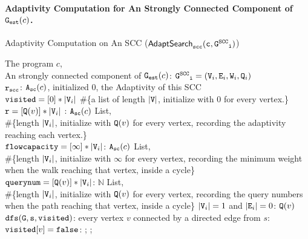\paragraph*{Adaptivity Computation for An Strongly Connected Component of $\mathtt{{G_{est}}}(c)$.}
\begin{algorithm}
 \caption{
 {Adaptivity Computation on An SCC ({$\mathtt{\mathsf{AdaptSearch}_{scc}(c, \mathtt{G^{SCC}}_i)}$})}
 \label{alg:adaptscc}
 }
 \begin{algorithmic}[1]
 \REQUIRE 
 The program $c$, 
 \\ \qquad
 An strongly connected component of $\mathtt{{G_{est}}}(c)$: 
 $ \mathtt{\mathtt{G^{SCC}}_i} = (\mathtt{V}_i, \mathtt{E}_i, \mathtt{W}_i, \mathtt{Q}_i)$
 \\
 $\mathtt{r_{scc}}$: ${\mathtt{A_{sc}}}(c)$, initialized $0$, the Adaptivity of this SCC
 \STATE {} 
 \\ \qquad $\mathtt{visited} = [0]*|\mathtt{V}_i|$ \#\{a list of length $|\mathtt{V}|$, initialize with $0$ for every vertex.\}
 \\ \qquad $\mathtt{r} = [\mathtt{Q}(v)]* |\mathtt{V}_i|$ : ${\mathtt{A_{sc}}}(c)$ List, 
 \\ \qquad \#\{length $|\mathtt{V}_i|$, initialize with $\mathtt{Q}(v)$ for every vertex, recording the adaptivity reaching each vertex.\}
 \\ \qquad $\mathtt{flowcapacity} = [\infty]* |\mathtt{V}_i|$: ${\mathtt{A_{sc}}}(c)$ List, 
 \\ \qquad \#\{length $|\mathtt{V}_i|$, initialize with $\infty$ for every vertex,
 recording the minimum weight when the walk reaching 
 that vertex, inside a cycle\}
 \\ \qquad $\mathtt{querynum} = [\mathtt{Q}(v)]* |\mathtt{V}_i|$: $\mathbb{N}$ List,
 \\ \qquad \#\{length $|\mathtt{V}_i|$, initialize with $\mathtt{Q}(v)$ for every vertex, 
 recording the query numbers when the path reaching 
 that vertex, inside a cycle\}
  $|\mathtt{V}_i| = 1$ and $|\mathtt{E}_i| = 0$:
 \STATE {} $\mathtt{Q}(v)$
  {$\mathtt{dfs(G,s,visited)}$}:
 \STATE {} every vertex $v$ 
 connected by a directed edge from $s$:
 \STATE \qquad {} $\mathtt{visited}[v] = \mathtt{false}$:
 \STATE \qquad \qquad \qquad {};
 \STATE \qquad \qquad \qquad {};

\end{algorithmic}
\end{algorithm}
